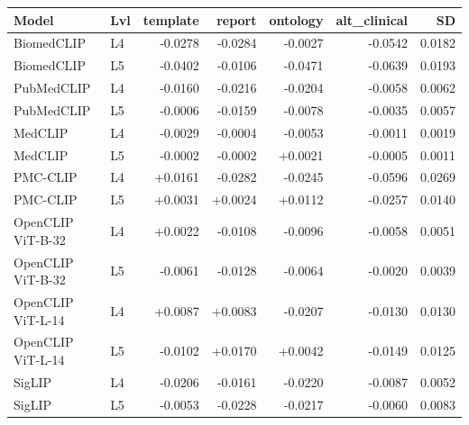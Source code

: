 \begin{tabular}{llrrrrr}
\toprule
Model & Lvl & template & report & ontology & alt_clinical & SD \\
\midrule
BiomedCLIP & L4 & -0.0278 & -0.0284 & -0.0027 & -0.0542 & 0.0182 \\
BiomedCLIP & L5 & -0.0402 & -0.0106 & -0.0471 & -0.0639 & 0.0193 \\
PubMedCLIP & L4 & -0.0160 & -0.0216 & -0.0204 & -0.0058 & 0.0062 \\
PubMedCLIP & L5 & -0.0006 & -0.0159 & -0.0078 & -0.0035 & 0.0057 \\
MedCLIP & L4 & -0.0029 & -0.0004 & -0.0053 & -0.0011 & 0.0019 \\
MedCLIP & L5 & -0.0002 & -0.0002 & +0.0021 & -0.0005 & 0.0011 \\
PMC-CLIP & L4 & +0.0161 & -0.0282 & -0.0245 & -0.0596 & 0.0269 \\
PMC-CLIP & L5 & +0.0031 & +0.0024 & +0.0112 & -0.0257 & 0.0140 \\
OpenCLIP ViT-B-32 & L4 & +0.0022 & -0.0108 & -0.0096 & -0.0058 & 0.0051 \\
OpenCLIP ViT-B-32 & L5 & -0.0061 & -0.0128 & -0.0064 & -0.0020 & 0.0039 \\
OpenCLIP ViT-L-14 & L4 & +0.0087 & +0.0083 & -0.0207 & -0.0130 & 0.0130 \\
OpenCLIP ViT-L-14 & L5 & -0.0102 & +0.0170 & +0.0042 & -0.0149 & 0.0125 \\
SigLIP & L4 & -0.0206 & -0.0161 & -0.0220 & -0.0087 & 0.0052 \\
SigLIP & L5 & -0.0053 & -0.0228 & -0.0217 & -0.0060 & 0.0083 \\
\bottomrule
\end{tabular}
